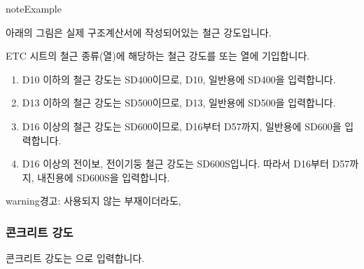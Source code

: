 \documentclass[a4paper,10pt,korean]{sphinxmanual}
\begin{document}
\begin{sphinxadmonition}{note}{Example}

\sphinxAtStartPar
아래의 그림은 실제 구조계산서에 작성되어있는 철근 강도입니다.

\begin{figure}[H]
\centering
\capstart

\noindent{}
\caption{}\label{\detokenize{2_etc:id6}}\end{figure}

\sphinxAtStartPar
ETC 시트의 철근 종류(열)에 해당하는 철근 강도를  또는 열에 기입합니다.

\begin{enumerate}
%
\item {} 
\sphinxAtStartPar
D10 이하의 철근 강도는 SD400이므로, D10, 일반용에 SD400을 입력합니다.

\item {} 
\sphinxAtStartPar
D13 이하의 철근 강도는 SD500이므로, D13, 일반용에 SD500을 입력합니다.

\item {} 
\sphinxAtStartPar
D16 이상의 철근 강도는 SD600이므로, D16부터 D57까지, 일반용에 SD600을 입력합니다.

\item {} 
\sphinxAtStartPar
D16 이상의 전이보, 전이기둥 철근 강도는 SD600S입니다. 따라서 D16부터 D57까지, 내진용에 SD600S을 입력합니다.

\end{enumerate}

\begin{sphinxadmonition}{warning}{경고:}
\sphinxAtStartPar
사용되지 않는 부재이더라도,
\end{sphinxadmonition}
\end{sphinxadmonition}


\subsubsection{콘크리트 강도}
\label{\detokenize{2_etc:id2}}
\sphinxAtStartPar
콘크리트 강도는 으로 입력합니다.
\end{document}
